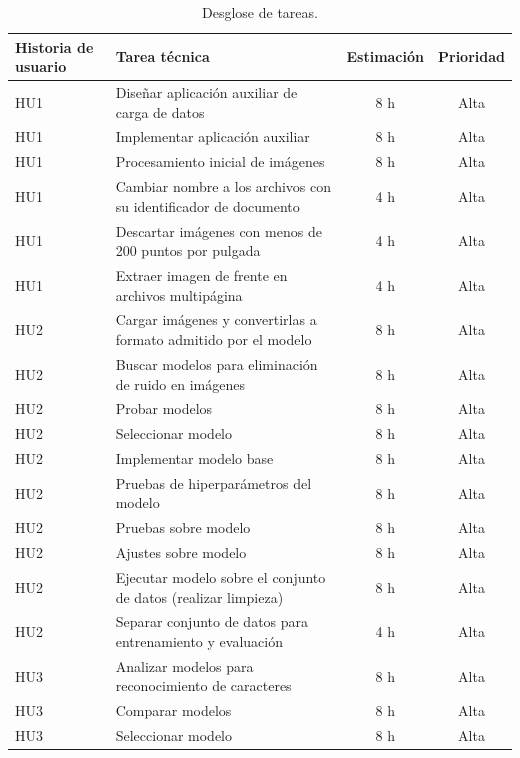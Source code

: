 \documentclass[
11pt, %
]{charter}
\begin{document}
\begin{table}[H]
\caption{Desglose de tareas.}
\centering
\begin{tabularx}{\linewidth}{@{}|l|X|c|c|@{}}
\hline
\rowcolor[HTML]{C0C0C0}
Historia de usuario & Tarea técnica & Estimación & Prioridad \\ \hline
HU1 & Diseñar aplicación auxiliar de carga de datos & 8 h & Alta \\ \hline
HU1 & Implementar aplicación auxiliar & 8 h & Alta \\ \hline
HU1 & Procesamiento inicial de imágenes & 8 h & Alta \\ \hline
HU1 & Cambiar nombre a los archivos con su identificador de documento & 4 h & Alta \\ \hline
HU1 & Descartar imágenes con menos de 200 puntos por pulgada & 4 h & Alta \\ \hline
HU1 & Extraer imagen de frente en archivos multipágina & 4 h & Alta \\ \hline

HU2 & Cargar imágenes y convertirlas a formato admitido por el modelo & 8 h & Alta \\ \hline
HU2 & Buscar modelos para eliminación de ruido en imágenes & 8 h & Alta \\ \hline
HU2 & Probar modelos & 8 h & Alta \\ \hline
HU2 & Seleccionar modelo & 8 h & Alta \\ \hline

HU2 & Implementar modelo base & 8 h & Alta \\ \hline
HU2 & Pruebas de hiperparámetros del modelo & 8 h & Alta \\ \hline
HU2 & Pruebas sobre modelo & 8 h & Alta \\ \hline
HU2 & Ajustes sobre modelo & 8 h & Alta \\ \hline

HU2 & Ejecutar modelo sobre el conjunto de datos (realizar limpieza) & 8 h & Alta \\ \hline
HU2 & Separar conjunto de datos para entrenamiento y evaluación & 4 h & Alta \\ \hline

HU3 & Analizar modelos para reconocimiento de caracteres & 8 h & Alta \\ \hline
HU3 & Comparar modelos & 8 h & Alta \\ \hline
HU3 & Seleccionar modelo & 8 h & Alta \\ \hline


\end{tabularx}
\end{table}
\end{document}
